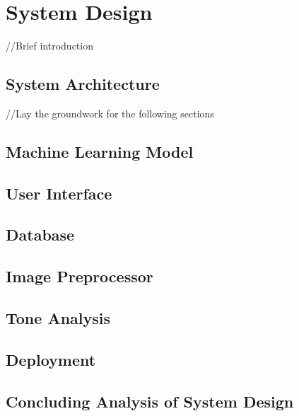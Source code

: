 \chapter{System Design}
//Brief introduction 

\section{System Architecture}
//Lay the groundwork for the following sections

\section{Machine Learning Model}

\section{User Interface}

\section{Database}

\section{Image Preprocessor}

\section{Tone Analysis}

\section{Deployment}


\section{Concluding Analysis of System Design}

